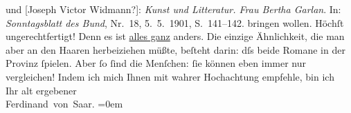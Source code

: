 \begin{ledgroupsized}[t]{13cm}
{{{                  und [Joseph Victor Widmann?]: \emph{Kunst und Litteratur. Frau Bertha Garlan}. In:
                        \emph{Sonntagsblatt des Bund}, Nr. 18,
                        5. 5. 1901, S. 141–142.}}}\label{K_L01130_1h} bringen wollen. Höchſt
               ungerechtfertigt! Denn es ist \uline{alles ganz} anders. Die
               einzige Ähnlichkeit, die man aber an den Haaren herbeiziehen müßte, beſteht darin:
               dſs beide Romane in der Provinz ſpielen. Aber ſo ſind die Menſchen: ſie können eben
               immer nur vergleichen! \pend
           \pstart
           Indem ich mich Ihnen mit wahrer Hochachtung empfehle, bin ich{\\[\baselineskip]}Ihr alt ergebener{\\[\baselineskip]}\spacefill\mbox{Ferdinand von Saar.}\pend
           \leftskip=0em{}\endnumbering{}\end{ledgroupsized}  \newcommand{\dateiname}{L01130}\newcommand{\titel}{Ferdinand von Saar an Arthur Schnitzler, 19. 6. 1901}\newcommand{\editorInnen}{Martin Anton Müller und Gerd-Hermann Susen}
            \footnotesize
\begin{ledgroupsized}[t]{11.5cm}
\end{ledgroupsized}
         
      